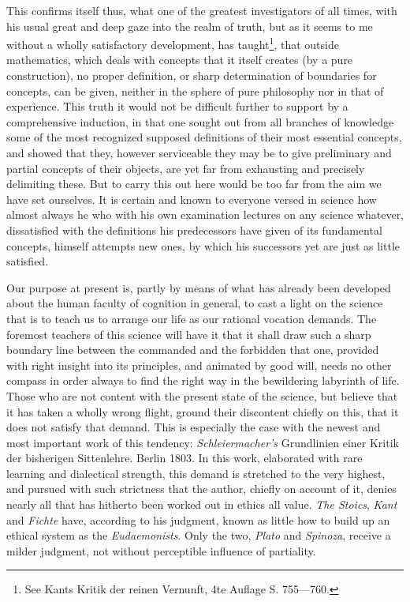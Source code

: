 \documentclass[12pt,a4paper,openany]{book}
\newcommand{\opage}[1]{\marginnote{\footnotesize\textit{[#1]}}}
\begin{document}
This confirms itself thus, what one of the greatest investigators of all times, with
his usual great and deep gaze into the realm of truth, but as it seems to me without
a wholly satisfactory development, has taught\footnote[1]{See Kants Kritik der reinen Vernunft, 4te Auflage S. 755---760.}, that outside mathematics,
which deals with concepts that it itself creates (by a pure construction), no proper
definition, or sharp determination of boundaries for concepts, can be given, neither
in the sphere of pure philosophy nor in that of experience. This truth it would not
be difficult further to support by a comprehensive induction, in that one sought out
from all branches of knowledge some of the most recognized supposed definitions of
their most essential concepts, and showed that they, however serviceable they may be
to give preliminary and partial concepts of their objects, are yet far from
exhausting and precisely delimiting these. But to carry this out here would be too
far from the aim we have set ourselves. It is certain and known to everyone versed
in science how almost always he who with his own examination lectures on any science
whatever, dissatisfied with the definitions his predecessors have given of its
fundamental concepts, himself attempts new ones, by which his successors yet are
just as little satisfied.

Our purpose at present is, partly by means of what has already been developed about
the human faculty of cognition in general, to cast a light on the science that is to
teach us to arrange our life as our rational vocation demands. The foremost teachers
of this science will have
\setcounter{footnote}{0}%
\opage{83}it that it shall draw such a sharp boundary line between the commanded and the
forbidden that one, provided with right insight into its principles, and animated by
good will, needs no other compass in order always to find the right way in the
bewildering labyrinth of life. Those who are not content with the present state of
the science, but believe that it has taken a wholly wrong flight, ground their
discontent chiefly on this, that it does not satisfy that demand. This is especially
the case with the newest and most important work of this tendency:
\emph{Schleiermacher's} Grundlinien einer Kritik der bisherigen Sittenlehre. Berlin
1803. In this work, elaborated with rare learning and dialectical strength, this
demand is stretched to the very highest, and pursued with such strictness that the
author, chiefly on account of it, denies nearly all that has hitherto been worked
out in ethics all value. \emph{The Stoics}, \emph{Kant} and \emph{Fichte} have,
according to his judgment, known as little how to build up an ethical system as the
\emph{Eudaemonists}. Only the two, \emph{Plato} and \emph{Spinoza}, receive a milder
judgment, not without perceptible influence of partiality.
\end{document}
